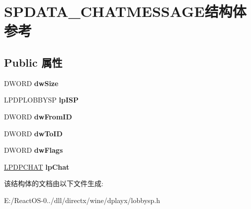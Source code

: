 \hypertarget{struct_s_p_d_a_t_a___c_h_a_t_m_e_s_s_a_g_e}{}\section{S\+P\+D\+A\+T\+A\+\_\+\+C\+H\+A\+T\+M\+E\+S\+S\+A\+G\+E结构体 参考}
\label{struct_s_p_d_a_t_a___c_h_a_t_m_e_s_s_a_g_e}
\subsection*{Public 属性}
\begin{DoxyCompactItemize}
\item 
\mbox{\label{struct_s_p_d_a_t_a___c_h_a_t_m_e_s_s_a_g_e_aa8a2e516239ceadd6ba3448717e8374f}} 
D\+W\+O\+RD {\bfseries dw\+Size}
\item 
\mbox{\label{struct_s_p_d_a_t_a___c_h_a_t_m_e_s_s_a_g_e_a54e58b111990cf2dbd941402e1f8460a}} 
L\+P\+D\+P\+L\+O\+B\+B\+Y\+SP {\bfseries lp\+I\+SP}
\item 
\mbox{\label{struct_s_p_d_a_t_a___c_h_a_t_m_e_s_s_a_g_e_a89c24bd16cb9c24e76198c3b178767ed}} 
D\+W\+O\+RD {\bfseries dw\+From\+ID}
\item 
\mbox{\label{struct_s_p_d_a_t_a___c_h_a_t_m_e_s_s_a_g_e_a2c072b7dad2da97ec85958c7176e8428}} 
D\+W\+O\+RD {\bfseries dw\+To\+ID}
\item 
\mbox{\label{struct_s_p_d_a_t_a___c_h_a_t_m_e_s_s_a_g_e_a16e3e327a9282cff25d7c9d91c0ec635}} 
D\+W\+O\+RD {\bfseries dw\+Flags}
\item 
\mbox{\label{struct_s_p_d_a_t_a___c_h_a_t_m_e_s_s_a_g_e_a57c07b6b6ab70c788ec500cc11d2d029}} 
\hyperlink{structtag_d_p_c_h_a_t}{L\+P\+D\+P\+C\+H\+AT} {\bfseries lp\+Chat}
\end{DoxyCompactItemize}


该结构体的文档由以下文件生成\+:\begin{DoxyCompactItemize}
\item 
E\+:/\+React\+O\+S-\/0../dll/directx/wine/dplayx/lobbysp.\+h\end{DoxyCompactItemize}
